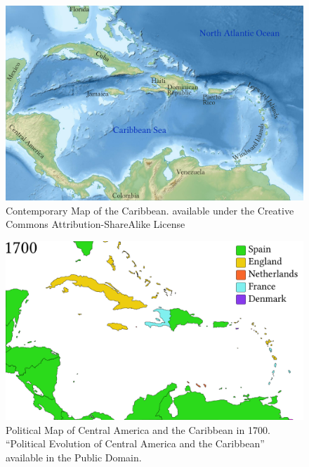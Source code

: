 \begin{figure}
\caption{\label{fig:key:3.3}  Contemporary Map of the Caribbean. \citet{Kmusser2011} available under the Creative Commons Attribution-ShareAlike License}

 

\includegraphics[width=\textwidth]{figures/img3-base.pdf}
 
\end{figure}

\begin{figure}

 

\includegraphics[width=\textwidth]{figures/img4-base.pdf}

\caption{\label{fig:key:3.4} Political Map of Central America and the Caribbean in 1700. \citet{Esemono2009} “Political Evolution of Central America and the Caribbean” available in the Public Domain.}
\end{figure}

